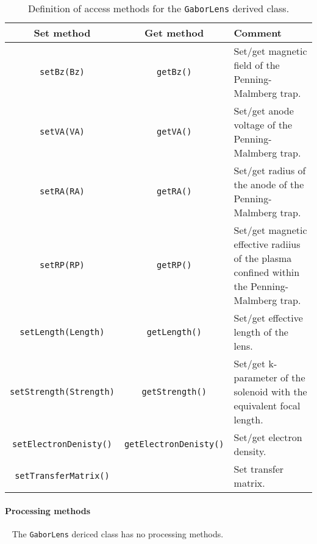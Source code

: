 \begin{table}[h]
  \caption{
    Definition of access methods for the \texttt{GaborLens} derived
    class. 
  }
  \label{Tab:GbrLns:Methods}
  \begin{center}
    \begin{tabular}{|c|c|p{7cm}|}
      \hline
      \textbf{Set method} & \textbf{Get method}  & \textbf{Comment}                                                 \\
      \hline
      \texttt{setBz(Bz)}         & \texttt{getBz()}     & Set/get magnetic field of the Penning-Malmberg trap.      \\
      \texttt{setVA(VA)}         & \texttt{getVA()}     & Set/get anode voltage of the Penning-Malmberg trap.       \\
      \texttt{setRA(RA)}         & \texttt{getRA()}     & Set/get radius of the anode of the Penning-Malmberg trap. \\
      \texttt{setRP(RP)}         & \texttt{getRP()}     & Set/get magnetic effective radiius of the plasma confined 
                                                          within the Penning-Malmberg trap.                         \\
      \texttt{setLength(Length)} & \texttt{getLength()} & Set/get effective length of the lens.                     \\

      \texttt{setStrength(Strength)} & \texttt{getStrength()} & Set/get k-parameter of the solenoid with the
                                                                equivalent focal length.                            \\
      \texttt{setElectronDenisty()} & \texttt{getElectronDenisty()} & Set/get electron density.                     \\
      \texttt{setTransferMatrix()} &                    & Set transfer matrix.                                      \\
      \hline
    \end{tabular}
  \end{center}
\end{table}

\paragraph{Processing methods} ~\newline
\noindent
The \texttt{GaborLens} dericed class has no processing methods.


